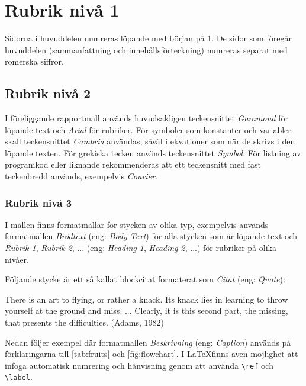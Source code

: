 \documentclass[12pt]{report}
\begin{document}


\newpage
{}

\chapter{Rubrik nivå 1}
Sidorna i huvuddelen numreras löpande med början på 1. De sidor som föregår
huvuddelen (sammanfattning och innehållsförteckning) numreras separat med
romerska siffror. 

\section{Rubrik nivå 2}
I föreliggande rapportmall används huvudsakligen teckensnittet
\textit{Garamond} för löpande text och \textit{Arial} för rubriker. För
symboler som konstanter och variabler skall teckensnittet \textit{Cambria}
användas, såväl i ekvationer som när de skrivs i den löpande texten. För
grekiska tecken används teckensnittet \textit{Symbol}. För listning av
programkod eller liknande rekommenderas att ett teckensnitt med fast
teckenbredd används, exempelvis \textit{Courier}.

\subsection{Rubrik nivå 3}
I mallen finns formatmallar för stycken av olika typ, exempelvis används
formatmallen \textit{Brödtext} (eng: \textit{Body Text}) för alla stycken
som är löpande text och \textit{Rubrik 1}, \textit{Rubrik 2}, ... (eng:
\textit{Heading 1}, \textit{Heading 2}, ...) för rubriker på olika nivåer.

Följande stycke är ett så kallat blockcitat formaterat som \textit{Citat}
(eng: \textit{Quote}):

\begin{displayquote}
    There is an art to flying, or rather a knack. Its knack lies in learning
    to throw yourself at the ground and miss. ... Clearly, it is this
    second part, the missing, that presents the difficulties. (Adams, 1982)
\end{displayquote}

Nedan följer exempel där formatmallen \textit{Beskrivning} (eng:
\textit{Caption}) används på förklaringarna till \ref{tab:fruits} och 
\ref{fig:flowchart}. I \LaTeX finns även möjlighet att infoga automatisk
numrering och hänvisning genom att använda \verb|\ref| och \verb|\label|.
\end{document}
